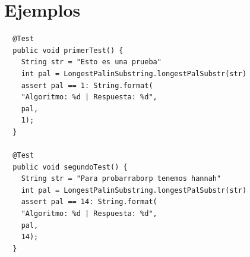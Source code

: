 \documentclass{report}
\begin{document}
		       \section{Ejemplos}
		       \begin{verbatim}
  @Test
  public void primerTest() {
    String str = "Esto es una prueba"
    int pal = LongestPalinSubstring.longestPalSubstr(str)
    assert pal == 1: String.format(
    "Algoritmo: %d | Respuesta: %d",
    pal,
    1);
  }

  @Test
  public void segundoTest() {
    String str = "Para probarraborp tenemos hannah"
    int pal = LongestPalinSubstring.longestPalSubstr(str)
    assert pal == 14: String.format(
    "Algoritmo: %d | Respuesta: %d",
    pal,
    14);
  }
  \end{verbatim}
\end{document}
